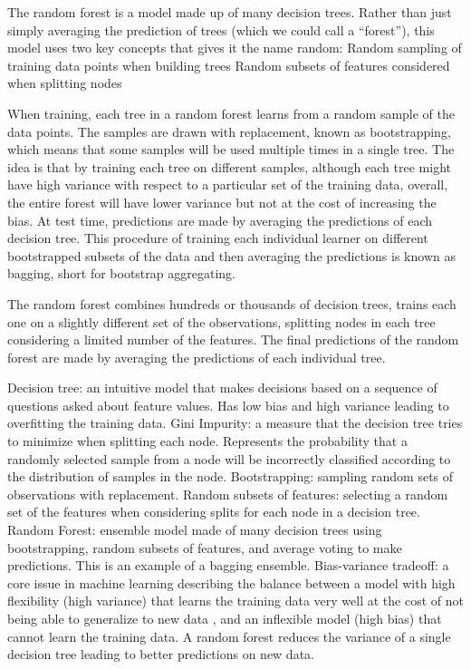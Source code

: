 \documentclass[12pt]{article}
\begin{document}

The random forest is a model made up of many decision trees. Rather than just simply averaging the prediction of trees (which we could call a “forest”), this model uses two key concepts that gives it the name random:
Random sampling of training data points when building trees
Random subsets of features considered when splitting nodes

When training, each tree in a random forest learns from a random sample of the data points. The samples are drawn with replacement, known as bootstrapping, which means that some samples will be used multiple times in a single tree. The idea is that by training each tree on different samples, although each tree might have high variance with respect to a particular set of the training data, overall, the entire forest will have lower variance but not at the cost of increasing the bias.
At test time, predictions are made by averaging the predictions of each decision tree. This procedure of training each individual learner on different bootstrapped subsets of the data and then averaging the predictions is known as bagging, short for bootstrap aggregating.

The random forest combines hundreds or thousands of decision trees, trains each one on a slightly different set of the observations, splitting nodes in each tree considering a limited number of the features. The final predictions of the random forest are made by averaging the predictions of each individual tree.

Decision tree: an intuitive model that makes decisions based on a sequence of questions asked about feature values. Has low bias and high variance leading to overfitting the training data.
Gini Impurity: a measure that the decision tree tries to minimize when splitting each node. Represents the probability that a randomly selected sample from a node will be incorrectly classified according to the distribution of samples in the node.
Bootstrapping: sampling random sets of observations with replacement.
Random subsets of features: selecting a random set of the features when considering splits for each node in a decision tree.
Random Forest: ensemble model made of many decision trees using bootstrapping, random subsets of features, and average voting to make predictions. This is an example of a bagging ensemble.
Bias-variance tradeoff: a core issue in machine learning describing the balance between a model with high flexibility (high variance) that learns the training data very well at the cost of not being able to generalize to new data , and an inflexible model (high bias) that cannot learn the training data. A random forest reduces the variance of a single decision tree leading to better predictions on new data.
\end{document}
